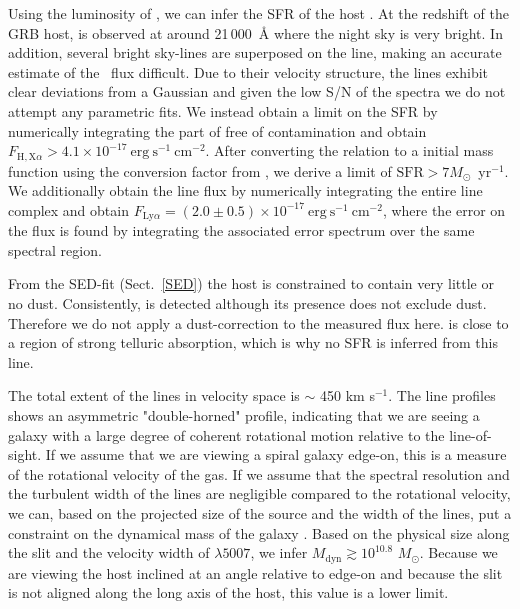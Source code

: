 \documentclass{aa}    %
\begin{document}
Using the luminosity of \ha, we can infer the SFR of the host
\citep{Kennicutt1998}. At the redshift of the GRB host, \ha{} is observed at
around 21\,000~\AA{} where the night sky is very bright. In addition, several
bright sky-lines are superposed on the line, making an accurate estimate of the
\ha~flux difficult. Due to their velocity structure, the lines exhibit clear
deviations from a Gaussian and given the low S/N of the spectra we do not
attempt any parametric fits. We instead obtain a limit on the SFR by numerically
integrating the part of \ha{} free of contamination and obtain $F_{\mathrm{H,X} \alpha} >
4.1 \times 10^{-17}~\mathrm{erg}~\mathrm{s}^{-1}~\mathrm{cm}^{-2}$. After
converting the \citet{Kennicutt1998} relation to a \citet{Chabrier2003} initial
mass function using the conversion factor from \citet{Madau2014}, we derive a
limit of $\mathrm{SFR} > 7 M_\odot$~yr$^{-1}$. We additionally obtain the \lya{} line
flux by numerically integrating the entire \lya{} line complex and obtain
$F_{\mathrm{Ly}\alpha} = (2.0 \pm 0.5) \times 10^{-17}~\mathrm{erg}~
\mathrm{s}^{-1}~\mathrm{cm}^{-2}$, where the error on the flux is found by
integrating the associated error spectrum over the same spectral region.


From the SED-fit (Sect.~\ref{SED}) the host is constrained to contain very
little or no dust. Consistently, \lya{} is detected although its presence does
not exclude dust. Therefore we do not apply a dust-correction to the measured
\ha{} flux here. \oii{} is close to a region of strong telluric absorption,
which is why no SFR is inferred from this line.

The total extent of the lines in velocity space is $\sim$ 450 km s$^{-1}$. The line
profiles shows an asymmetric "double-horned" profile, indicating that we are
seeing a galaxy with a large degree of coherent rotational motion relative to
the line-of-sight. If we assume that we are viewing a spiral galaxy edge-on,
this is a measure of the rotational velocity of the gas. If we assume that the
spectral resolution and the turbulent width of the lines are negligible compared
to the rotational velocity, we can, based on the projected size of the source
and the width of the lines, put a constraint on the dynamical mass of the galaxy
\citep{DeBlok2014}. Based on the physical size along the slit and the velocity
width of \oiii$\lambda5007$, we infer $M_\text{dyn} \gtrsim 10^{10.8}$
$M_\odot$. Because we are viewing the host inclined at an angle relative to
edge-on and because the slit is not aligned along the long axis of the host,
this value is a lower limit. 
\end{document}

